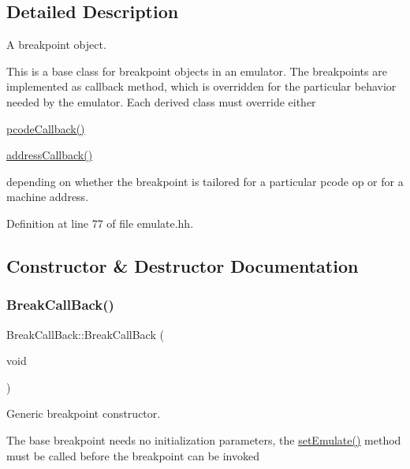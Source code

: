 \subsection{Detailed Description}
A breakpoint object. 

This is a base class for breakpoint objects in an emulator. The breakpoints are implemented as callback method, which is overridden for the particular behavior needed by the emulator. Each derived class must override either
\begin{DoxyItemize}
\item \mbox{\hyperlink{class_break_call_back_a93cd065c519c0e08e2c7729cb649f236}{pcode\+Callback()}}
\item \mbox{\hyperlink{class_break_call_back_adb97ba6b111cb9a84856c9e0f9d506f9}{address\+Callback()}}
\end{DoxyItemize}

depending on whether the breakpoint is tailored for a particular pcode op or for a machine address. 

Definition at line 77 of file emulate.\+hh.



\subsection{Constructor \& Destructor Documentation}
\mbox{\label{class_break_call_back_a40f84ad3345a12ea46550bdc41f6ba6a}} 
\subsubsection{\texorpdfstring{BreakCallBack()}{BreakCallBack()}}
{\footnotesize\ttfamily Break\+Call\+Back\+::\+Break\+Call\+Back (\begin{DoxyParamCaption}\item[{void}]{ }\end{DoxyParamCaption})\hspace{0.3cm}{\ttfamily [inline]}}



Generic breakpoint constructor. 

The base breakpoint needs no initialization parameters, the \mbox{\hyperlink{class_break_call_back_a22f41c29017f4977efde2a489b07592b}{set\+Emulate()}} method must be called before the breakpoint can be invoked 

